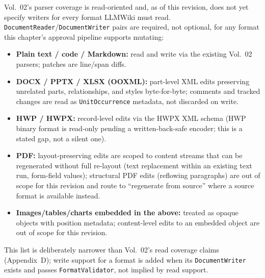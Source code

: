 Vol.~02's parser coverage is read-oriented and, as of this revision, does not yet specify writers for every format LLMWiki must read. \texttt{DocumentReader}/\texttt{DocumentWriter} pairs are required, not optional, for any format this chapter's approval pipeline supports mutating:

\begin{itemize}
  \item \textbf{Plain text / code / Markdown:} read and write via the existing Vol.~02 parsers; patches are line/span diffs.
  \item \textbf{DOCX / PPTX / XLSX (OOXML):} part-level XML edits preserving unrelated parts, relationships, and styles byte-for-byte; comments and tracked changes are read as \texttt{UnitOccurrence} metadata, not discarded on write.
  \item \textbf{HWP / HWPX:} record-level edits via the HWPX XML schema (HWP binary format is read-only pending a written-back-safe encoder; this is a stated gap, not a silent one).
  \item \textbf{PDF:} layout-preserving edits are scoped to content streams that can be regenerated without full re-layout (text replacement within an existing text run, form-field values); structural PDF edits (reflowing paragraphs) are out of scope for this revision and route to ``regenerate from source'' where a source format is available instead.
  \item \textbf{Images/tables/charts embedded in the above:} treated as opaque objects with position metadata; content-level edits to an embedded object are out of scope for this revision.
\end{itemize}

This list is deliberately narrower than Vol.~02's read coverage claims (Appendix~D); write support for a format is added when its \texttt{DocumentWriter} exists and passes \texttt{FormatValidator}, not implied by read support.
